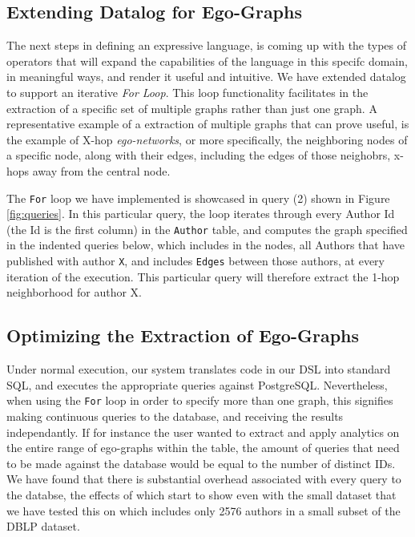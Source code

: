 \documentclass[11pt,letterpaper]{article}
\begin{document}
\subsection*{Extending Datalog for Ego-Graphs}

The next steps in defining an expressive language, is coming up with the types of operators that will expand the capabilities of the language in this specifc domain, in meaningful ways, and render it useful and intuitive. We have extended datalog to support an iterative \textit{For Loop}. This loop functionality facilitates in the extraction of a specific set of multiple graphs rather than just one graph. A representative example of a  extraction of multiple graphs that can prove useful, is the example of X-hop \textit{ego-networks}, or more specifically, the neighboring nodes of a specific node, along with their edges, including the edges of those neighobrs, x-hops away from the central node.

The \texttt{For} loop we have implemented is showcased in query (2) shown in Figure \ref{fig:queries}. In this particular query, the loop iterates through every Author Id (the Id is the first column) in the \texttt{Author} table, and computes the graph specified in the indented queries below, which includes in the nodes, all Authors that have published with author \texttt{X}, and includes \texttt{Edges} between those authors, at every iteration of the execution. This particular query will therefore extract the 1-hop neighborhood for author X.

\subsection*{Optimizing the Extraction of Ego-Graphs}

Under normal execution, our system translates code in our DSL into standard SQL, and executes the appropriate queries against PostgreSQL. Nevertheless, when using the \texttt{For} loop in order to specify more than one graph, this signifies making continuous queries to the database, and receiving the results independantly. If for instance the user wanted to extract and apply analytics on the entire range of ego-graphs within the table, the amount of queries that need to be made against the database would be equal to the number of distinct IDs. We have found that there is substantial overhead associated with every query to the databse, the effects of which start to show even with the small dataset that we have tested this on which includes only 2576 authors in a small subset of the DBLP dataset.
\end{document}
